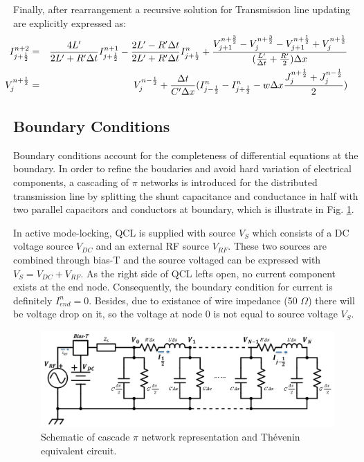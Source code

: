 \documentclass[11pt,final]{scrbook}
\begin{document}
Finally, after rearrangement a recursive solution for Transmission line updating are explicitly expressed as:
\begin{eqnarray}
 \hspace{-8mm} { I }_{ j+\frac{1}{2} }^{ n+2 } &=& \frac { 4L' }{ 2L'+R'\Delta t }{ I }_{ j+\frac{1}{2} }^{ n+1 }-\frac { 2L'-R'\Delta t }{ 2L'+R'\Delta t }{ I }_{ j+\frac{1}{2} }^{ n }+\frac { { V }_{ j+1 }^{ n+\frac{3}{2} }-{ V }_{ j }^{ n+\frac{3}{2}}-{ V }_{ j+1 }^{ n+\frac{1}{2} }+{ V }_{ j }^{ n+\frac{1}{2} } }{  (\frac { L' }{ \Delta t } +\frac { R' }{ 2 })\Delta x }\label{eq:TL_I}\\
 \hspace{-8mm} { V }_{ j }^{ n+\frac{1}{2} } &=& { V }_{ j }^{ n-\frac{1}{2} } + \frac{ \Delta t }{ C'\Delta x } ({ I }_{ j-\frac{1}{2} }^{ n}-{ I }_{ j+\frac{1}{2} }^{ n } - w\Delta x\frac{{J}_{j}^{n+\frac{1}{2}}+{J}_{j}^{n-\frac{1}{2}}}{2}) \label{eq:TL_U}
\end{eqnarray}



\subsection{Boundary Conditions}
Boundary conditions account for the completeness of differential equations at the boundary. In order to refine the boudaries and avoid hard variation of electrical components, a cascading of $\pi$ networks\cite{orlandi1996fdtd} is introduced for the distributed transmission line by splitting the shunt capacitance and conductance in half with two parallel capacitors and conductors at boundary, which is illustrate in Fig. \ref{fig:BoundaryCondition}. 

In active mode-locking, QCL is supplied with source $ {V}_{S} $ which consists of a DC voltage source $ {V}_{DC} $ and an external RF source $ {V}_{RF} $. These two sources are combined through bias-T and the source voltaged can be expressed with $ {V}_{S}=V_{DC}+{V}_{RF} $. As the right side of QCL lefts open, no current component exists at the end node. Consequently, the boundary condition for current is definitely ${I}_{end}^{n} = 0$. Besides, due to existance of wire impedance (50 $\Omega$) there will be voltage drop on it, so the voltage at node 0 is not equal to source voltage $ {V}_{S} $.
\begin{figure}[htbp]
\begin{center}
\includegraphics[scale=0.55]{pi_representation}
\caption{Schematic of cascade $\pi$ network representation and Thévenin equivalent circuit.}
\label{fig:BoundaryCondition}
\end{center}
\end{figure}
\end{document}
